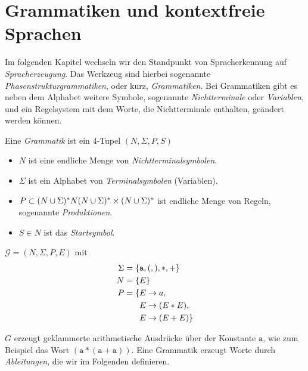 \section{Grammatiken und kontextfreie Sprachen}
Im folgenden Kapitel wechseln wir den Standpunkt von Spracherkennung auf \emph{Spracherzeugung}.
Das Werkzeug sind hierbei sogenannte \emph{Phasenstrukturgrammatiken}, oder kurz, \emph{Grammatiken}.
Bei Grammatiken gibt es neben dem Alphabet weitere Symbole, sogenannte \emph{Nichtterminale} oder \emph{Variablen}, und ein Regelsystem mit dem Worte, die Nichtterminale enthalten, geändert werden können.
\begin{Def}[Chomsky]
	Eine \emph{Grammatik} ist ein 4-Tupel $(N,\Sigma,P,S)$
	\begin{itemize}
	\item $N$ ist eine endliche Menge von \emph{Nichtterminalsymbolen}.
	\item $\Sigma$ ist ein Alphabet von \emph{Terminalsymbolen} (Variablen).
	\item $P\subset (N\cup\Sigma)^*N(N\cup\Sigma)^* \times (N\cup\Sigma)^*$ ist endliche Menge von Regeln, sogenannte \emph{Produktionen}.
	\item $S\in N$ ist das \emph{Startsymbol}.
	\end{itemize}
\end{Def}
\begin{Bsp}
  $\mathcal{G} = (N, \Sigma, P, E)$ mit
	\begin{align*}
		\Sigma &= \{ \mathtt{a},\mathtt{(},\mathtt{)},\mathtt{*},\mathtt{+} \}\\
		N &= \{E\}\\
		P &= \begin{aligned}[t]
      \{ E &\-> a,\\
      E &\-> (E*E),\\
      E &\-> (E+E) \}
        \end{aligned}
	\end{align*}
\end{Bsp}
  $G$ erzeugt geklammerte arithmetische Ausdrücke über der Konstante $\mathtt{a}$, wie zum Beispiel das Wort $\mathtt{(a*(a+a))}$.
  Eine Grammatik erzeugt Worte durch \emph{Ableitungen}, die wir im Folgenden definieren.
